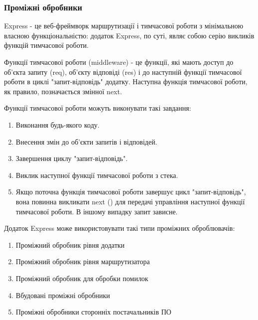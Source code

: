 \subsubsection{Проміжні обробники} \label{subs:middleware}

Express - це веб-фреймворк маршрутизації і тимчасової роботи з мінімальною власною функціональністю: додаток Express, по суті, являє собою серію викликів функцій тимчасової роботи.

Функції тимчасової роботи (middleware) - це функції, які мають доступ до об'єкта запиту (req), об'єкту відповіді (res) і до наступній функції тимчасової роботи в циклі "запит-відповідь" додатку. Наступна функція тимчасової роботи, як правило, позначається змінної next.

Функції тимчасової роботи можуть виконувати такі завдання:

\begin{enumerate}
	\item Виконання будь-якого коду.
	\item Внесення змін до об'єкти запитів і відповідей.
	\item Завершення циклу "запит-відповідь".
	\item Виклик наступної функції тимчасової роботи з стека.
	\item Якщо поточна функція тимчасової роботи завершує цикл "запит-відповідь", вона повинна викликати next () для передачі управління наступної функції тимчасової роботи. В іншому випадку запит зависне.
\end{enumerate}	

Додаток Express може використовувати такі типи проміжних оброблювачів:

\begin{enumerate}
	\item Проміжний обробник рівня додатки
	\item Проміжний обробник рівня маршрутизатора
	\item Проміжний обробник для обробки помилок
	\item Вбудовані проміжні обробники
	\item Проміжні обробники сторонніх постачальників ПО
\end{enumerate}	
